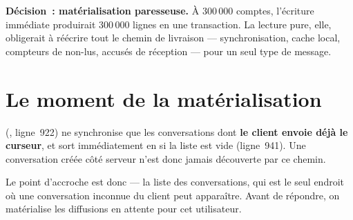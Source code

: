 \textbf{Décision~: matérialisation paresseuse.} À 300\,000 comptes, l'écriture immédiate
produirait 300\,000 lignes  en une transaction. La lecture pure, elle, obligerait
à réécrire tout le chemin de livraison --- synchronisation, cache local, compteurs de non-lus,
accusés de réception --- pour un seul type de message.

\section{Le moment de la matérialisation}

\begin{constat}
 (, ligne~922) ne
synchronise que les conversations dont \textbf{le client envoie déjà le curseur}, et sort
immédiatement en  si la liste est vide (ligne~941).
Une conversation créée côté serveur n'est donc jamais découverte par ce chemin.
\end{constat}

Le point d'accroche est donc  --- la liste des conversations,
qui est le seul endroit où une conversation inconnue du client peut apparaître. Avant de
répondre, on matérialise les diffusions en attente pour cet utilisateur.

